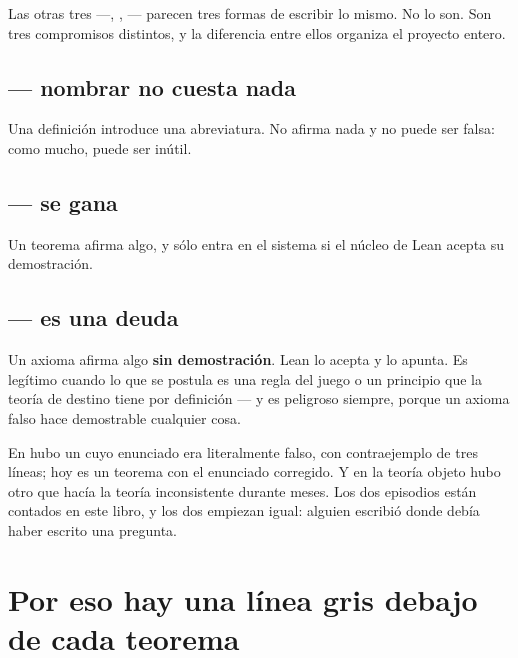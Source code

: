 Las otras tres —, , — parecen tres formas de escribir lo
mismo. No lo son. Son tres compromisos distintos, y la diferencia entre ellos organiza el proyecto
entero.

\subsection*{ — nombrar no cuesta nada}

Una definición introduce una abreviatura. No afirma nada y no puede ser falsa: como mucho, puede ser
inútil.


\subsection*{ — se gana}

Un teorema afirma algo, y sólo entra en el sistema si el núcleo de Lean acepta su demostración.


\subsection*{ — es una deuda}

Un axioma afirma algo \textbf{sin demostración}. Lean lo acepta y lo apunta. Es legítimo cuando lo
que se postula es una regla del juego o un principio que la teoría de destino tiene por definición
— y es peligroso siempre, porque un axioma falso hace demostrable cualquier cosa.


\begin{muro}
En  hubo un  cuyo enunciado era literalmente falso, con contraejemplo de
tres líneas; hoy es un teorema con el enunciado corregido. Y en la teoría objeto hubo otro que hacía
la teoría inconsistente durante meses. Los dos episodios están contados en este libro, y los dos
empiezan igual: alguien escribió  donde debía haber escrito una pregunta.
\end{muro}

\section{Por eso hay una línea gris debajo de cada teorema}

